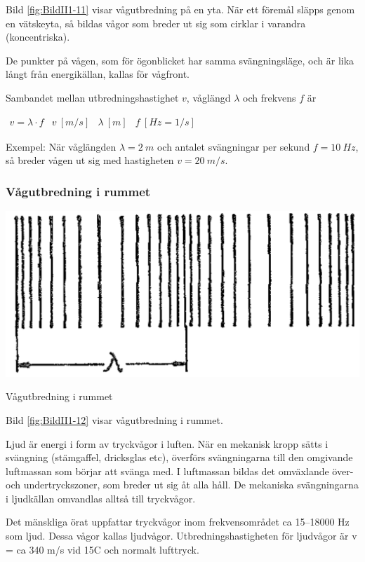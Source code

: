 Bild \ref{fig:BildII1-11} visar vågutbredning på en yta.
När ett föremål släpps genom en vätskeyta, så bildas vågor som breder ut sig
som cirklar i varandra (koncentriska).

De punkter på vågen, som för ögonblicket har samma svängningsläge, och är lika
långt från energikällan, kallas för vågfront.

Sambandet mellan utbredningshastighet \(v\), våglängd \(\lambda\) och frekvens
\(f\) är

\(
\begin{array}{llll}
v = \lambda \cdot f & v \ [m/s] & \lambda \ [m] & f \ [Hz=1/s]
\end{array}
\)

Exempel: När våglängden \(\lambda = 2\ m\) och antalet svängningar per sekund
\(f = 10\ Hz\), så breder vågen ut sig med hastigheten \(v = 20\ m/s\).

\subsubsection{Vågutbredning i rummet}

\begin{marginfigure}
  \includegraphics[width=\textwidth]{images/cropped_pdfs/bild_2_1-12.pdf}
  \caption{Vågutbredning i rummet}
  \label{fig:BildII1-12}
\end{marginfigure}

Bild \ref{fig:BildII1-12} visar vågutbredning i rummet.

Ljud är energi i form av tryckvågor i luften.
När en mekanisk kropp sätts i svängning (stämgaffel, dricksglas etc), överförs
svängningarna till den omgivande luftmassan som börjar att svänga med.
I luftmassan bildas det omväxlande över- och undertryckszoner, som breder ut
sig åt alla håll.
De mekaniska svängningarna i ljudkällan omvandlas alltså till tryckvågor.

Det mänskliga örat uppfattar tryckvågor inom frekvensområdet ca
15--18000 Hz som ljud.
Dessa vågor kallas ljudvågor.
Utbredningshastigheten för ljudvågor är v = ca 340 m/s vid
15\degree C och normalt lufttryck.


